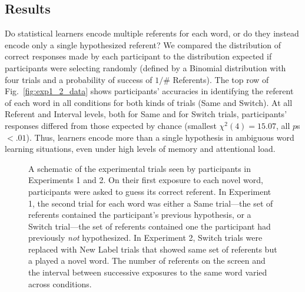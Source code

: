 \documentclass{pnastwo}
\begin{document}
\begin{article}
\subsection{Results}


Do statistical learners encode multiple referents for each word, or do they instead encode only a single hypothesized referent? We compared the distribution of correct responses made by each participant to the distribution expected if participants were selecting randomly (defined by a Binomial distribution with four trials and a probability of success of  $1/$\# Referents). The top row of Fig.~\ref{fig:exp1_2_data} shows participants' accuracies in identifying the referent of each word in all conditions for both kinds of trials (Same and Switch). At all Referent and Interval levels, both for Same and for Switch trials, participants' responses differed from those expected by chance (smallest $\chi^{2}(4) = 15.07$, all $p$s $< .01$). Thus, learners encode more than a single hypothesis in ambiguous word learning situations, even under high levels of memory and attentional load. 


\begin{figure}
	\caption{\label{fig:design} A schematic of the experimental trials seen by participants in Experiments 1 and 2. On their first exposure to each novel word, participants were asked to guess its correct referent. In Experiment 1, the second trial for each word was either a Same trial---the set of referents contained the participant's previous hypothesis, or a Switch trial---the set of referents contained one the participant had previously \emph{not} hypothesized. In Experiment 2, Switch trials were replaced with New Label trials that showed same set of referents but a played a novel word. The number of referents on the screen and the interval between successive exposures to the same word varied across conditions.}
\end{figure}


\end{article}
\end{document}
